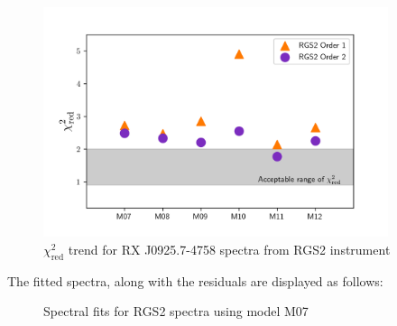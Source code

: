 			\begin{figure}[h!]
				\centering
				\includegraphics[width=0.9\textwidth]{mrvel-rgs2-chisq}
				\caption{$\chi^2_\text{red}$ trend for RX J0925.7-4758 spectra from RGS2 instrument}
				\label{fig:mrvel-rgs2-chisq}
			\end{figure}
			The fitted spectra, along with the residuals are displayed as follows:
			\begin{figure}[h!]
				\centering
				 \hfill
				\caption{Spectral fits for RGS2 spectra using model M07}
				\label{xmm:rgs2-m07}
			\end{figure}
			
